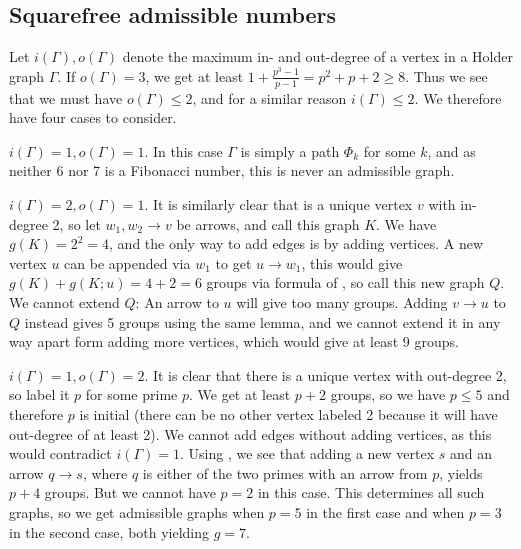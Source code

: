 \documentclass[draft]{article}
\theoremstyle{plain}
\theoremstyle{definition}
\begin{document}
\subsection{Squarefree admissible numbers}
Let $i(\Gamma), o(\Gamma)$ denote the maximum in- and out-degree of a vertex in a Holder graph $\Gamma$. If $o(\Gamma) = 3$, we get at least $1 + \frac{p^3 - 1}{p - 1} = p^2 + p + 2 \ge 8$. Thus we see that we must have $o(\Gamma) \le 2$, and for a similar reason $i(\Gamma) \le 2$. We therefore have four cases to consider.

 $i(\Gamma) = 1, o(\Gamma) = 1$. In this case $\Gamma$ is simply a path $\Phi_k$ for some $k$, and as neither 6 nor 7 is a Fibonacci number, this is never an admissible graph.

 $i(\Gamma) = 2, o(\Gamma) = 1$. It is similarly clear that is a unique vertex $v$ with in-degree 2, so let $w_1, w_2 \rightarrow v$ be arrows, and call this graph $K$. We have $g(K) = 2^2 = 4$, and the only way to add edges is by adding vertices. A new vertex $u$ can be appended via $w_1$ to get $u \rightarrow w_1$, this would give $g(K) + g(K; u) = 4 + 2 = 6$ groups via formula  of , so call this new graph $Q$. We cannot extend $Q$: An arrow to $u$ will give too many groups. Adding $v \rightarrow u$ to $Q$ instead gives 5 groups using the same lemma, and we cannot extend it in any way apart form adding more vertices, which would give at least 9 groups.

 $i(\Gamma) = 1, o(\Gamma) = 2$. It is clear that there is a unique vertex with out-degree 2, so label it $p$ for some prime $p$. We get at least $p + 2$ groups, so we have $p \le 5$ and therefore $p$ is initial (there can be no other vertex labeled 2 because it will have out-degree of at least 2). We cannot add edges without adding vertices, as this would contradict $i(\Gamma) = 1$. Using , we see that adding a new vertex $s$ and an arrow $q \rightarrow s$, where $q$ is either of the two primes with an arrow from $p$, yields $p + 4$ groups. But we cannot have $p = 2$ in this case. This determines all such graphs, so we get admissible graphs when $p = 5$ in the first case and when $p = 3$ in the second case, both yielding $g = 7$.
\end{document}
